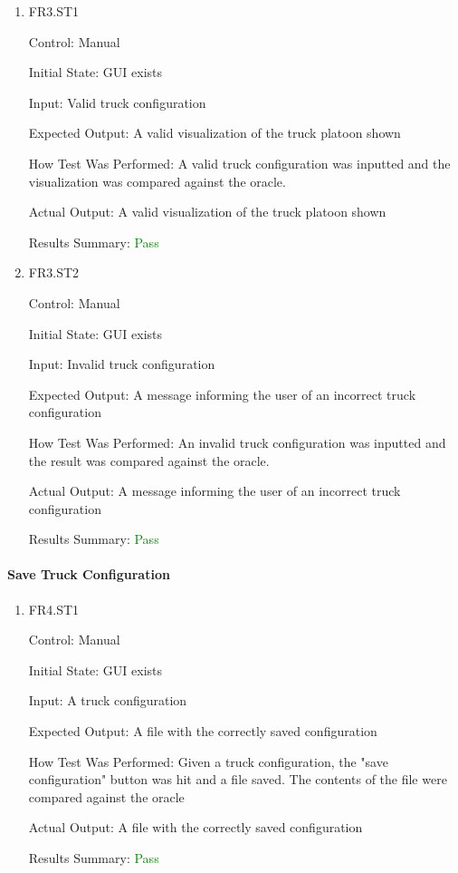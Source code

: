 \documentclass[12pt, titlepage]{article}
\begin{document}
\begin{enumerate}

  \item{FR3.ST1\\}

  Control: Manual

  Initial State: GUI exists

  Input: Valid truck configuration

  Expected Output: A valid visualization of the truck platoon shown

  How Test Was Performed: A valid truck configuration was inputted and the visualization was compared against the oracle.

  Actual Output: A valid visualization of the truck platoon shown

  Results Summary: \textcolor{green} {Pass}

  \item{FR3.ST2\\}

  Control: Manual

  Initial State: GUI exists

  Input: Invalid truck configuration

  Expected Output: A message informing the user of an incorrect truck configuration

  How Test Was Performed: An invalid truck configuration was inputted and the result was compared against the oracle.

  Actual Output: A message informing the user of an incorrect truck configuration

  Results Summary: \textcolor{green} {Pass}

\end{enumerate}

\paragraph{Save Truck Configuration}

\begin{enumerate}

  \item{FR4.ST1\\}

  Control: Manual

  Initial State: GUI exists

  Input: A truck configuration

  Expected Output: A file with the correctly saved configuration

  How Test Was Performed: Given a truck configuration, the "save configuration" button was hit and a file saved. The contents of the file were compared against the oracle

  Actual Output: A file with the correctly saved configuration

  Results Summary: \textcolor{green} {Pass}

\end{enumerate}
\end{document}
